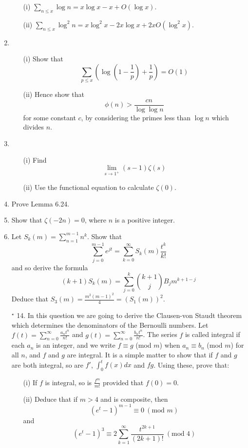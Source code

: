 \begin{enumerate}
\begin{enumerate}
      \item[(i)]$\sum_{n \le x}\log{n}=x\log{x}-x+O(\log{x})$.
      \item[(ii)]$\sum_{n \le x}\log^2{n}=x \log^2{x}-2x\log{x}+2xO(\log^2{x})$.
      \end{enumerate}
\item \begin{enumerate}
      \item[(i)] Show that
      $$\sum_{p \le x}\left(\log{\left(1-\frac{1}{p}\right)}+\frac{1}{p}\right)=O(1)$$
      \item[(ii)] Hence show that
      $$\phi(n)>\frac{cn}{\log{\log{n}}}$$ for some constant $c$, by considering the primes less than
      $\log{n}$ which divides $n$.
      \end{enumerate}
\item \begin{enumerate}
\item[(i)] Find $$\lim_{s \to 1^+}(s-1)\zeta(s)$$
\item[(ii)]
Use the functional equation to calculate $\zeta(0)$.
\end{enumerate}
\item Prove Lemma 6.24.
\item Show that $\zeta(-2n)=0$, where $n$ is a positive integer.
\item Let $S_k(m)=\sum_{n=1}^{m-1} n^k$. Show that
$$\sum_{j=0}^{m-1}e^{jt}=\sum_{k=0}^{\infty} S_k(m)\frac{t^k}{k!}$$
      and so derive the formula
$$(k+1)S_k(m)=\sum_{j=0}^k \binom{k+1}{j}B_j m^{k+1-j}$$
      Deduce that $S_3(m)=\frac{m^2(m-1)^2}{4}=(S_1(m))^2$.
\item[$^\star$ 14.] In this question we are going to derive the Clausen-von Staudt theorem which determines the denominators of the Bernoulli numbers. Let $f(t)=\sum_{n=0}^\infty \frac{a_nt^n}{n!}$ and $g(t)=\sum_{n=0}^\infty \frac{b_nt^n}{n!}$. The series $f$ is called integral if each $a_n$ is
    an integer, and we write $f \equiv g$ (mod $m$) when $a_n \equiv b_n$ (mod $m$) for all $n$, and
    $f$ and $g$ are integral. It is a simple matter to show that if $f$ and $g$ are both integral, so are $f'$, $\int_0^tf(x)dx$ and $fg$. Using these, prove that:
    \begin{enumerate}
    \item[(i)] If $f$ is integral, so is $\frac{f^m}{m!}$ provided that $f(0)=0$.
    \item[(ii)] Deduce that if $m>4$ and is composite, then
    $$(e^t-1)^{m-1} \equiv 0~(\text{mod } m)$$
    and
    $$(e^t-1)^3 \equiv 2\sum_{k=1}^\infty \frac{t^{2k+1}}{(2k+1)!}~(\text{mod } 4)$$

\end{enumerate}
\end{enumerate}
